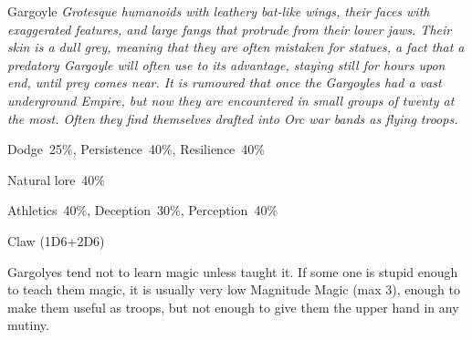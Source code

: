 \begin{monsterbox}{Gargoyle}
	\textit{Grotesque humanoids with leathery bat-like wings, their faces with exaggerated features, and large fangs that protrude from their lower jaws. Their skin is a dull grey, meaning that they are often mistaken for statues, a fact that a predatory Gargoyle will often use to its advantage, staying still for hours upon end, until prey comes near. It is rumoured that once the Gargoyles had a vast underground Empire, but now they are encountered in small groups of twenty at the most. Often they find themselves drafted into Orc war bands as flying troops.}\\
	\rpghline
	\basics[%
        hitpoints  = 14,
	majorwound = 7,
	damagemodifier = +2D6,
	powerpoints = 11,
	movementrate = {15m, 23m flying},
	armor = Tough Hide (6AP),
	plunderrating = 0
	]
	\rpghline%
	\stats[ %
		STR = 5D6+12 (29),
		CON = 3D6    (11),
		DEX = 3D6    (11),
		SIZ = 5D6    (17),
		INT = 1D6    (4),
		POW = 3D6    (11),
		CHA = 1D6    (4)
	]
	\rpghline%
	\begin{rpg-monsteraction}[Resistances]
		Dodge~25\%, Persistence~40\%, Resilience~40\%
	\end{rpg-monsteraction}
	\begin{rpg-monsteraction}[Knowledge]
    		Natural lore~40\%
	\end{rpg-monsteraction}
	\begin{rpg-monsteraction}[Practical]
		Athletics~40\%, Deception~30\%, Perception~40\%
	\end{rpg-monsteraction}
	\begin{rpg-monsteraction}
		Claw (1D6+2D6)
	\end{rpg-monsteraction}
	\begin{rpg-monsteraction}[Supernatural]
		Gargolyes tend not to learn magic unless taught it. If some one is stupid enough to teach them magic, it is usually very low Magnitude Magic (max 3), enough to make them useful as troops, but not enough to give them the upper hand in any mutiny.
	\end{rpg-monsteraction}

\end{monsterbox}




